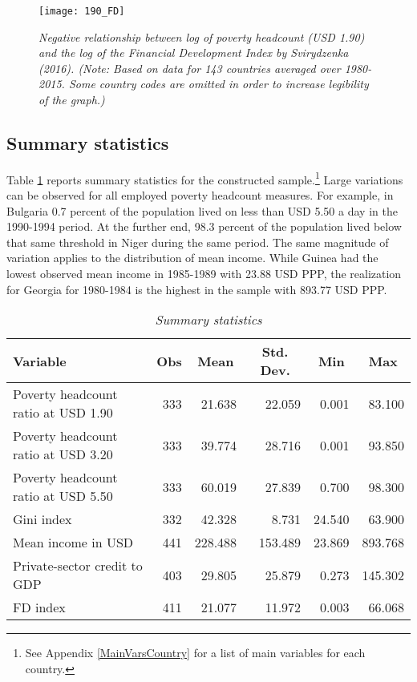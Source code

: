 \documentclass[12pt, a4paper]{article}
\begin{document}
\begin{figure}[h]
	\texttt{[image: 190\_FD]}
	\centering
	\caption[Plot of Headcount Poverty at USD 1.90 against the FD index]{\textit{Negative relationship between log of poverty headcount (USD 1.90) and the log of the Financial Development Index by Svirydzenka (2016). (Note: Based on data for 143 countries averaged over 1980-2015. Some country codes are omitted in order to increase legibility of the graph.)}}
	\label{fig2}
\end{figure}

\subsection{Summary statistics}

Table \ref{tab:summary} reports summary statistics for the constructed sample.\footnote{See Appendix \ref{MainVarsCountry} for a list of main variables for each country.} Large variations can be observed for all employed poverty headcount measures. For example, in Bulgaria 0.7 percent of the population lived on less than USD 5.50 a day in the 1990-1994 period. At the further end, 98.3 percent of the population lived below that same threshold in Niger during the same period. The same magnitude of variation applies to the distribution of mean income. While Guinea had the lowest observed mean income in 1985-1989 with 23.88 USD PPP, the realization for Georgia for 1980-1984 is the highest in the sample with 893.77 USD PPP.

\begin{table}[ht]
	\centering
	\begin{tabular}{lrrrrr}
		\toprule
		Variable & \multicolumn{1}{c}{Obs} & \multicolumn{1}{c}{Mean} & \multicolumn{1}{c}{Std. Dev.} & \multicolumn{1}{c}{Min} & \multicolumn{1}{c}{Max} \\
		\midrule
		Poverty headcount ratio at USD 1.90 & 333   & 21.638 & 22.059 & 0.001 & 83.100 \\
		Poverty headcount ratio at USD 3.20 & 333   & 39.774 & 28.716 & 0.001 & 93.850 \\
		Poverty headcount ratio at USD 5.50 & 333   & 60.019 & 27.839 & 0.700 & 98.300 \\
		Gini index & 332   & 42.328 & 8.731 & 24.540 & 63.900 \\
		Mean income in USD & 441   & 228.488 & 153.489 & 23.869 & 893.768 \\
		Private-sector credit to GDP & 403   & 29.805 & 25.879 & 0.273 & 145.302 \\
		FD index & 411   & 21.077 & 11.972 & 0.003 & 66.068 \\
		\bottomrule
	\end{tabular}
	\caption[Summary Statistics]{\textit{Summary statistics}}
	\label{tab:summary}
\end{table}%
\end{document}
